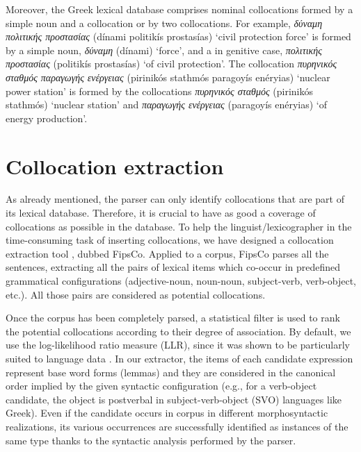 \documentclass[output=paper]{langsci/langscibook}
\begin{document}
Moreover, the Greek lexical database comprises nominal collocations formed by a simple noun and a collocation or by two collocations. For example, \textit{δύναμη πολιτικής προστασίας} (dínami politikís prostasías) `civil protection force' is for\-med by a simple noun, \textit{δύναμη} (dínami) `force', and a  in genitive case, \textit{πολιτικής προστασίας} (politikís prostasías) `of civil protection'. The collocation \textit{πυρηνικός σταθμός παραγωγής ενέργειας} (pirinikós stathmós para\-goyís enéryias) `nuclear power station' is formed by the collocations \textit{πυρηνικός σταθμός} (pirinikós stathmós) `nuclear station' and \textit{παραγωγής ενέργειας} (para\-goyís enéry\-ias) `of energy production'.  


\section{Collocation extraction}
\label{fou:sec5}
As already mentioned, the parser can only identify collocations that are part of its lexical database. Therefore, it is crucial to have as good a coverage of collocations as possible in the database. To help the linguist/lexicographer in the time-consuming task of inserting collocations, we have designed a collocation  extraction tool \citep{seretan11}, dubbed FipsCo. Applied to a corpus, FipsCo parses all the sentences, extracting all the pairs of lexical items which co-occur in predefined grammatical configurations (adjective-noun, noun-noun, subject-verb, verb-object, etc.). All those pairs are considered as potential collocations.

Once the corpus has been completely parsed, a statistical filter  is used to rank the potential collocations according to their degree of association. By default, we use the log-likelihood ratio measure (LLR), since it was shown to be particularly suited to language data \citep{dunning93}. In our extractor, the items of each candidate expression represent base word forms (lemmas) and they are considered in the canonical order implied by the given syntactic configuration (e.g., for a verb-object candidate, the object is postverbal in subject-verb-object (SVO) languages like Greek). Even if the candidate occurs in corpus in different morphosyntactic realizations, its various occurrences are successfully identified as instances of the same type thanks to the syntactic analysis performed by the parser. 
\end{document}
